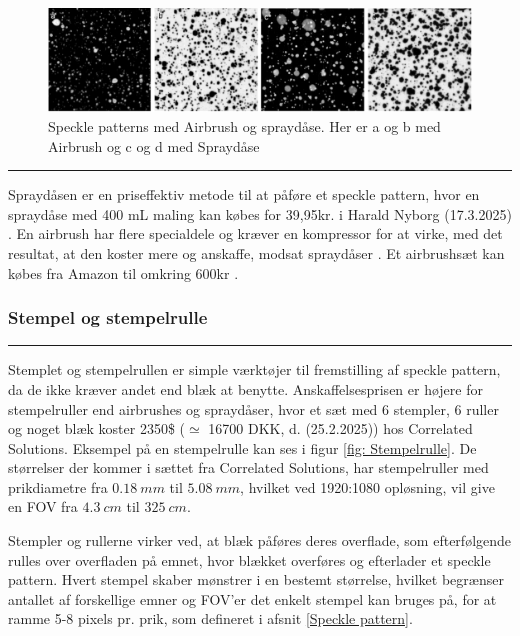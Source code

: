 \begin{figure}[H]
    \centering
    \includegraphics[width=1.0\linewidth]{Sections/2 Problemanalyse/Media/AirvsSprayinline.png}
    \caption{Speckle patterns med Airbrush og spraydåse. Her er a og b med Airbrush og c og d med Spraydåse \parencite{Crammond2013SpeckleCorrelation}}
    \label{Spraymetode}
\end{figure} \plainbreak{-0.5}


Spraydåsen er en priseffektiv metode til at påføre et  speckle pattern, hvor en spraydåse med 400 mL maling kan købes for 39,95kr. i Harald Nyborg (17.3.2025) \parencite{HaraldNyborg2025ColorWorksMat}. En airbrush har flere specialdele og kræver en kompressor for at virke, med det resultat, at den koster mere og anskaffe, modsat spraydåser \parencite{Dong2017ACorrelation}. Et airbrushsæt kan købes fra Amazon til omkring 600kr \parencite{TIMBERTECH2025Amazon.comAirbrush}.



\subsubsection{Stempel og stempelrulle} \plainbreak{-0.4}
Stemplet og stempelrullen er simple værktøjer til fremstilling af speckle pattern, da de ikke kræver andet end blæk at benytte. Anskaffelsesprisen er højere for stempelruller end airbrushes og spraydåser, hvor et sæt med 6 stempler, 6 ruller og noget blæk koster 2350\$ ($\simeq$ 16700 DKK, d. (25.2.2025)) hos Correlated Solutions. Eksempel på en stempelrulle kan ses i figur \ref{fig: Stempelrulle}. De størrelser der kommer i sættet fra Correlated Solutions, har stempelruller med prikdiametre fra $\SI{0,18}{mm}$ til $\SI{5,08}{mm}$, hvilket ved 1920:1080 opløsning, vil give en FOV fra $\SI{4,3}{cm}$ til $\SI{325}{cm}$. \parencite{CorrelatedSolutions2025VICCorrelation}

Stempler og rullerne virker ved, at blæk påføres deres overflade, som efterfølgende rulles over overfladen på emnet, hvor blækket overføres og efterlader et speckle pattern. Hvert stempel skaber mønstrer i en bestemt størrelse, hvilket begrænser antallet af forskellige emner og FOV'er det enkelt stempel kan bruges på, for at ramme 5-8 pixels pr. prik, som defineret i afsnit \ref{Speckle pattern}. \parencite{Dong2017ACorrelation}



